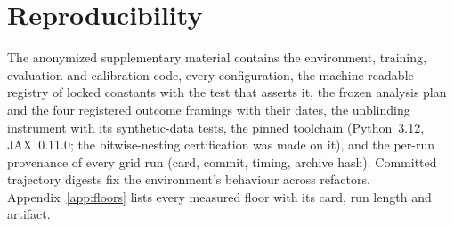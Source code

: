 \section{Reproducibility}
\label{sec:repro}

The anonymized supplementary material contains the environment, training,
evaluation and calibration code, every configuration, the machine-readable
registry of locked constants with the test that asserts it, the frozen
analysis plan and the four registered outcome framings with their dates, the
unblinding instrument with its synthetic-data tests, the pinned toolchain
(Python~3.12, JAX~0.11.0; the bitwise-nesting certification was made on it),
and the per-run provenance of every grid run (card, commit, timing, archive
hash). Committed trajectory digests fix the environment's behaviour across
refactors. Appendix~\ref{app:floors} lists every measured floor with its
card, run length and artifact.
